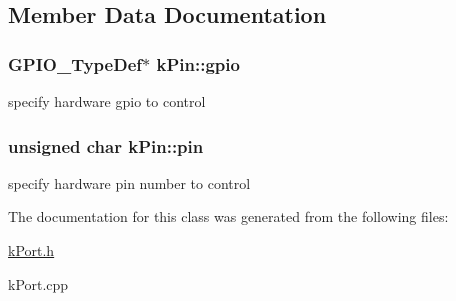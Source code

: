 \subsection{Member Data Documentation}
\subsubsection[{\texorpdfstring{gpio}{gpio}}]{\setlength{\rightskip}{0pt plus 5cm}G\+P\+I\+O\+\_\+\+Type\+Def$\ast$ k\+Pin\+::gpio}\hypertarget{classkPin_a3aee22ce5c4e5bc8703f881efa5f3375}{}\label{classkPin_a3aee22ce5c4e5bc8703f881efa5f3375}
specify hardware gpio to control 
\subsubsection[{\texorpdfstring{pin}{pin}}]{\setlength{\rightskip}{0pt plus 5cm}unsigned char k\+Pin\+::pin}\hypertarget{classkPin_a0da283781fc832c77419bc71ff356cc1}{}\label{classkPin_a0da283781fc832c77419bc71ff356cc1}
specify hardware pin number to control 

The documentation for this class was generated from the following files\+:\begin{DoxyCompactItemize}
\item 
\hyperlink{kPort_8h}{k\+Port.\+h}\item 
k\+Port.\+cpp\end{DoxyCompactItemize}
